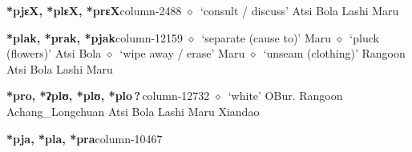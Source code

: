   \item {\footnotesize \textbf{*pjɛX, *plɛX, *prɛX}}{\tiny column-2488}
         $\diamond$~`consult / discuss'
         Atsi 
\hspace{1ex}
         Bola 
\hspace{1ex}
         Lashi 
\hspace{1ex}
         Maru 
  \item {\footnotesize \textbf{*plak, *prak, *pjak}}{\tiny column-12159}
         $\diamond$~`separate (cause to)'
         Maru 
\hspace{1ex}
         $\diamond$~`pluck (flowers)'
         Atsi 
\hspace{1ex}
         Bola 
\hspace{1ex}
         $\diamond$~`wipe away / erase'
         Maru 
\hspace{1ex}
         $\diamond$~`unseam (clothing)'
         Rangoon 
\hspace{1ex}
         Atsi 
\hspace{1ex}
         Bola 
\hspace{1ex}
         Lashi 
\hspace{1ex}
         Maru 
  \item {\footnotesize \textbf{*pro, *ʔplʊ, *plʊ, *plo\,?\,}}{\tiny column-12732}
         $\diamond$~`white'
         OBur. 
\hspace{1ex}
         Rangoon 
\hspace{1ex}
         Achang\_Longchuan 
\hspace{1ex}
         Atsi 
\hspace{1ex}
         Bola 
\hspace{1ex}
         Lashi 
\hspace{1ex}
         Maru 
\hspace{1ex}
         Xiandao 
  \item {\footnotesize \textbf{*pja, *pla, *pra}}{\tiny column-10467}
